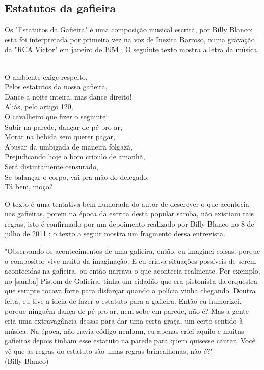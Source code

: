 \subsection{Estatutos da gafieira}
Os "Estatutos da Gafieira" é uma composição musical escrita, por Billy Blanco;
esta foi interpretada por primeira vez na voz de Inezita Barroso, 
numa gravação da "RCA Victor" em janeiro de 1954 \cite{musicaestatuto};
O seguinte texto mostra a letra da música.
\begin{tcolorbox}[colback=lowgray,colframe=lowgray]%
\\
O ambiente exige respeito,\\
Pelos estatutos da nossa gafieira,\\
Dance a noite inteira, mas dance direito!\\
Aliás, pelo artigo 120,\\
O cavalheiro que fizer o seguinte:\\
Subir na parede, dançar de pé pro ar,\\
Morar na bebida sem querer pagar,\\
Abusar da umbigada de maneira folgazã,\\
Prejudicando hoje o bom crioulo de amanhã,\\
Será distintamente censurado,\\
Se balançar o corpo, vai pra mão do delegado.\\
Tá bem, moço?\\
\end{tcolorbox}
O texto é uma tentativa bem-humorada do autor de descrever o que acontecia 
nas gafieiras, porem na época da escrita desta popular samba, não
existiam tais regras, isto é confirmado por um depoimento realizado por 
Billy Blanco no 8 de julho de 2011 \cite{depoimentobilly}; o texto a seguir
mostra um fragmento dessa entrevista.

\begin{tcolorbox}[colback=lowgray,colframe=lowgray]%
"Observando os acontecimentos de uma gafieira, então, eu imaginei
coisas, porque o compositor vive muito da imaginação. E eu criava situações 
possíveis de serem acontecidas na gafieira, ou então narrava o que
acontecia realmente. Por exemplo, no [samba] Pistom de Gafieira, tinha
um cidadão que era pistonista da orquestra que sempre tocava forte para
disfarçar quando a polícia vinha chegando. Doutra feita, eu tive a ideia
de fazer o estatuto para a gafieira. Então eu humorizei, porque ninguém
dança de pé pro ar, nem sobe em parede, não é? Mas a gente cria uma
extravagância dessas para dar uma certa graça, um certo sentido à música.
Na época, não havia código nenhum, eu apenas criei aquilo e muitas gafieiras 
depois tinham esse estatuto na parede para quem quisesse cantar.
Você vê que as regras do estatuto são umas regras brincalhonas, não é?" 
~\\
(Billy Blanco)
\end{tcolorbox}

